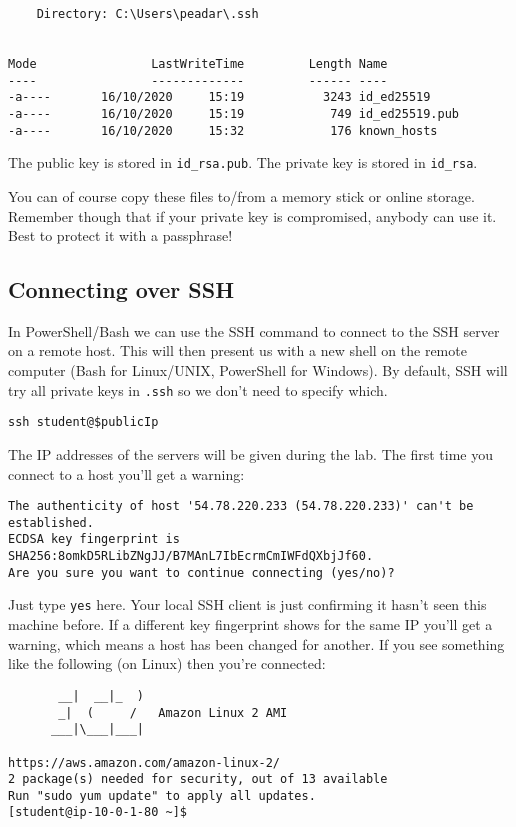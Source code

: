 \begin{verbatim}
    Directory: C:\Users\peadar\.ssh


Mode                LastWriteTime         Length Name
----                -------------         ------ ----
-a----       16/10/2020     15:19           3243 id_ed25519
-a----       16/10/2020     15:19            749 id_ed25519.pub
-a----       16/10/2020     15:32            176 known_hosts
\end{verbatim}

The public key is stored in \texttt{id\_rsa.pub}.
The private key is stored in \texttt{id\_rsa}.

You can of course copy these files to/from a memory stick or online storage.
Remember though that if your private key is compromised, anybody can use it.
Best to protect it with a passphrase!

\subsection{Connecting over SSH}
\label{connecting-over-ssh}

In PowerShell/Bash we can use the SSH command to connect to the SSH server on a remote host.
This will then present us with a new shell on the remote computer (Bash for Linux/UNIX, PowerShell for Windows).
By default, SSH will try all private keys in \texttt{.ssh} so we don't need to specify which.

\begin{verbatim}
ssh student@$publicIp 
\end{verbatim}

The IP addresses of the servers will be given during the lab.
The first time you connect to a host you'll get a warning:

\begin{verbatim}
The authenticity of host '54.78.220.233 (54.78.220.233)' can't be established.
ECDSA key fingerprint is SHA256:8omkD5RLibZNgJJ/B7MAnL7IbEcrmCmIWFdQXbjJf60.
Are you sure you want to continue connecting (yes/no)?
\end{verbatim}

Just type \texttt{yes} here.
Your local SSH client is just confirming it hasn't seen this machine before.
If a different key fingerprint shows for the same IP you'll get a warning, which means a host has been changed for another.
If you see something like the following (on Linux) then you're connected:

\begin{verbatim}
       __|  __|_  )
       _|  (     /   Amazon Linux 2 AMI
      ___|\___|___|

https://aws.amazon.com/amazon-linux-2/
2 package(s) needed for security, out of 13 available
Run "sudo yum update" to apply all updates.
[student@ip-10-0-1-80 ~]$
\end{verbatim}


